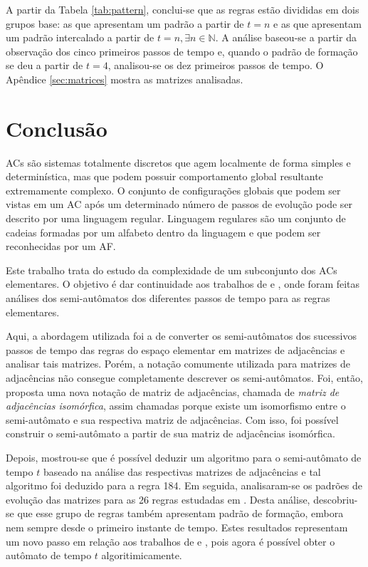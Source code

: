 \documentclass[12pt,a4paper]{article}
\begin{document}
A partir da Tabela \ref{tab:pattern}, conclui-se que as regras estão divididas
em dois grupos base: as que apresentam um padrão a partir de $t=n$ e as que
apresentam um padrão intercalado a partir de $t=n,\exists n \in \mathbb{N}$.
A análise baseou-se a partir da observação dos cinco primeiros passos de
tempo e, quando o padrão de formação se deu a partir de $t=4$, analisou-se
os dez primeiros passos de tempo. O Apêndice \ref{sec:matrices} mostra as
matrizes analisadas. 

\newpage

\section{Conclusão}\label{sec:conclude}

ACs são sistemas totalmente discretos que agem localmente de forma simples
e determinística, mas que podem possuir
comportamento global resultante extremamente complexo. O conjunto de configurações
globais que podem ser vistas em um AC após um determinado
número de passos de evolução pode ser descrito por uma linguagem
regular. Linguagem regulares são um conjunto de cadeias formadas
por um alfabeto dentro da linguagem e que podem ser reconhecidas por um
AF.

Este trabalho trata do estudo da complexidade de um subconjunto dos ACs
elementares. O objetivo é dar continuidade aos trabalhos de
 e , onde foram feitas
análises dos semi-autômatos dos diferentes passos de tempo
para as regras elementares.

Aqui, a abordagem utilizada foi a de converter os semi-autômatos dos sucessivos
passos de tempo das regras do espaço elementar em matrizes de adjacências e analisar
tais matrizes. Porém, a notação comumente utilizada para matrizes de adjacências
não consegue completamente descrever os semi-autômatos. Foi, então, proposta uma
nova notação de matriz de adjacências, chamada de \textit{matriz de
adjacências isomórfica}, assim chamadas porque existe um isomorfismo entre
o semi-autômato e sua respectiva matriz de adjacências. Com isso, foi possível
construir o semi-autômato a partir de sua matriz de adjacências isomórfica.

Depois, mostrou-se que é possível deduzir um algoritmo para o semi-autômato
de tempo $t$ baseado na análise das respectivas matrizes de adjacências e tal
algoritmo foi deduzido para a regra 184. Em seguida, analisaram-se
os padrões de evolução das matrizes para as 26 regras estudadas em
. Desta análise, descobriu-se que esse grupo de regras
também apresentam padrão de formação, embora nem sempre desde o primeiro
instante de tempo. Estes resultados representam um novo passo em relação
aos trabalhos de  e , pois
agora é possível obter o autômato de tempo $t$ algoritimicamente.
\end{document}
